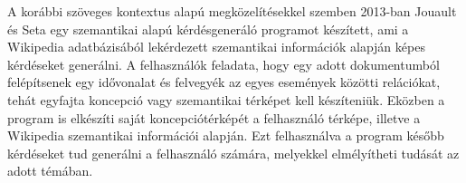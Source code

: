 A korábbi szöveges kontextus alapú megközelítésekkel szemben 2013-ban Jouault és Seta egy szemantikai alapú kérdésgeneráló programot készített, ami a Wikipedia adatbázisából lekérdezett szemantikai információk alapján képes kérdéseket generálni. A felhasználók feladata, hogy egy adott dokumentumból felépítsenek egy idővonalat és felvegyék az egyes események közötti relációkat, tehát egyfajta koncepció vagy szemantikai térképet kell készíteniük. Eközben a program is elkészíti saját koncepciótérképét a felhasználó térképe, illetve a Wikipedia szemantikai információi alapján. Ezt felhasználva a program később kérdéseket tud generálni a felhasználó számára, melyekkel elmélyítheti tudását az adott témában.\cite{question_generation}

